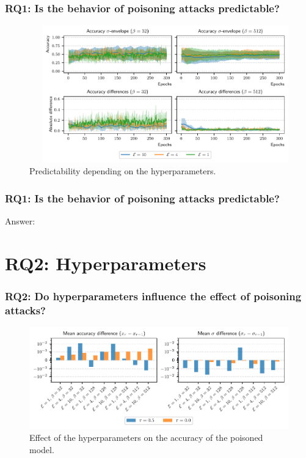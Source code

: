 \documentclass[color,t,presentation,english,aspectratio=169]{beamer}
\begin{document}
\begin{frame}
	\frametitle{RQ1: Is the behavior of poisoning attacks predictable?}
	\begin{figure}
		\begin{columns}
			\begin{column}{.2\textwidth}
				\vspace{-\textheight}
				\caption{Predictability depending on the hyperparameters.}
			\end{column}
			\begin{column}{.8\textwidth}
				\includegraphics[width=\linewidth]{figures/predictability-envelopes.pdf}
			\end{column}
		\end{columns}
	\end{figure}
\end{frame}

\begin{frame}
\frametitle{RQ1: Is the behavior of poisoning attacks predictable?}
\centering
\vfill
Answer: 
\vfill
\end{frame}

\section{RQ2: Hyperparameters}

\begin{frame}
	\frametitle{RQ2: Do hyperparameters influence the effect of poisoning attacks?}

	\begin{figure}
		\centering
		\includegraphics[width=.8\textwidth]{figures/hyperparams-continous-cicids-small.pdf}
		\caption{Effect of the hyperparameters on the accuracy of the poisoned model.}
	\end{figure}
\end{frame}
\end{document}
